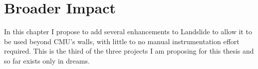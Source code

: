 \chapter{Broader Impact}
\label{chap:lipservice}

In this chapter I propose to add several enhancements to Landslide to allow it to be used beyond CMU's walls,
with little to no manual instrumentation effort required.
This is the third of the three projects I am proposing for this thesis and so far exists only in dreams.
